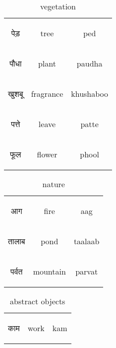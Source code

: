 \begin{table}[H]
    \centering 
    \begin{tabular}{c|c|c}
            \begin{hindi} पेड़  \end{hindi} & tree & ped \\
            \begin{hindi} पौधा  \end{hindi} & plant & paudha \\
            \begin{hindi} खुशबू  \end{hindi} & fragrance & khushaboo \\
            \begin{hindi} पत्ते  \end{hindi} & leave & patte \\
            \begin{hindi} फूल  \end{hindi} & flower & phool \\
    \end{tabular}
    \caption{vegetation}
    \label{tab:nouns_vegetation}
\end{table}

\begin{table}[H]
    \centering 
    \begin{tabular}{c|c|c}
            \begin{hindi} आग  \end{hindi} & fire & aag \\
            \begin{hindi} तालाब  \end{hindi} & pond & taalaab \\
            \begin{hindi} पर्वत  \end{hindi} & mountain & parvat \\
    \end{tabular}
    \caption{nature}
    \label{tab:nouns_nature}
\end{table}


\begin{table}[H]
    \centering 
    \begin{tabular}{c|c|c}
        \begin{hindi} काम \end{hindi} & work & kam \\
    \end{tabular}
    \caption{abstract objects}
    \label{tab:nouns_abstract}
\end{table}


